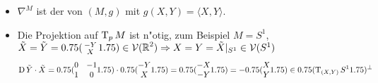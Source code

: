 \begin{bem}\begin{itemize}[leftmargin=*]
\item
	$\nabla^M$ ist der  von $(M,g)$ mit $g(X,Y) = \langle X, Y \rangle$.
\item
	Die Projektion auf $\operatorname{T}_pM$ ist n"otig, zum Beispiel $M = S^1$, $\tilde X = \tilde Y = 0.75(\begin{smallmatrix} -Y \\ X \end{smallmatrix}1.75) \in \operatorname{\mathcal{V}}(\operatorname{\mathbb{R}}^2) \Rightarrow X = Y = \tilde X|_{S^1} \in \operatorname{\mathcal{V}}(S^1)$
		\[ \D \tilde Y \cdot \tilde X = \begin{pmatrix} 0 & -1 \\ 1 & 0 \end{pmatrix} \cdot \begin{pmatrix} -Y \\ X \end{pmatrix} = \begin{pmatrix} -X \\ -Y \end{pmatrix} = -\begin{pmatrix} X \\ Y \end{pmatrix} \in \left( \T_{(X,Y)}S^1 \right)^\perp \]
\end{itemize}\end{bem}

